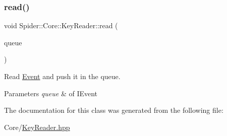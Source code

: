 \subsubsection{\texorpdfstring{read()}{read()}}
{\footnotesize\ttfamily void Spider\+::\+Core\+::\+Key\+Reader\+::read (\begin{DoxyParamCaption}\item[{\hyperlink{class_spider_1_1_event_1_1_event_queue}{Event\+::\+Event\+Queue} $\ast$}]{queue }\end{DoxyParamCaption})}



Read \hyperlink{namespace_spider_1_1_event}{Event} and push it in the queue. 


\begin{DoxyParams}{Parameters}
{\em queue} & of I\+Event \\
\hline
\end{DoxyParams}


The documentation for this class was generated from the following file\+:\begin{DoxyCompactItemize}
\item 
Core/\hyperlink{_key_reader_8hpp}{Key\+Reader.\+hpp}\end{DoxyCompactItemize}
